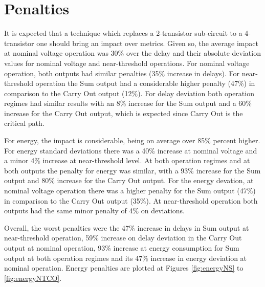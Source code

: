 \documentclass[ecp,tc, english]{iiufrgs}
\begin{document}
\section{Penalties}

It is expected that a technique which replaces a 2-transistor sub-circuit to a 4-transistor one should bring an impact over metrics. Given so, the average impact at nominal voltage operation was 30\% over the delay and their absolute deviation values for nominal voltage and near-threshold operations. For nominal voltage operation, both outputs had similar penalties (35\% increase in delays). For near-threshold operation the Sum output had a considerable higher penalty (47\%) in comparison to the Carry Out output (12\%). For delay deviation both operation regimes had similar results with an 8\% increase for the Sum output and a 60\% increase for the Carry Out output, which is expected since Carry Out is the critical path.


For energy, the impact is considerable, being on average over 85\% percent higher. For energy standard deviations there was a 40\% increase at nominal voltage and a minor 4\% increase at near-threshold level. At both operation regimes and at both outputs the penalty for energy was similar, with a 93\% increase for the Sum output and 80\% increase for the Carry Out output. For the energy devation, at nominal voltage operation there was a higher penalty for the Sum output (47\%) in comparison to the Carry Out output (35\%). At near-threshold operation both outputs had the same minor penalty of 4\% on deviations. 

Overall, the worst penalties were the 47\% increase in delays in Sum output at near-threshold operation, 59\% increase on delay deviation in the Carry Out output at nominal operation, 93\% increase at energy consumption for Sum output at both operation regimes and its 47\% increase in energy deviation at nominal operation. Energy penalties are plotted at Figures \ref{fig:energyNS} to \ref{fig:energyNTCO}. 
\end{document}
